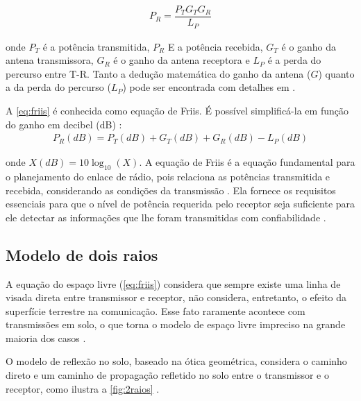 \begin{equation}
	\begin{aligned}
	\label{eq:friis}
		P_R = \dfrac{P_TG_TG_R}{L_P}
	\end{aligned}
\end{equation}

\noindent onde $P_T$ é a potência transmitida, $P_R$ E a potência recebida, $G_T$ é o ganho da antena transmissora, $G_R$ é o ganho da antena receptora e $L_P$ é a perda do percurso entre T-R. Tanto a dedução matemática do ganho da antena ($G$) quanto a da perda do percurso ($L_P$) pode ser encontrada com detalhes em .

A \autoref{eq:friis} é conhecida como equação de Friis. É possível simplificá-la em função do ganho em decibel (dB) \cite{haykin2008}:
\begin{equation}
	\begin{aligned}
	\label{eq:friis-decibel}
		P_R(dB) = P_T(dB) + G_T(dB) + G_R(dB) - L_P(dB)
	\end{aligned}
\end{equation}

\noindent onde $X(dB) = 10\log_{10} (X)$. A equação de Friis é a equação fundamental para o planejamento do enlace de rádio, pois relaciona as potências transmitida e recebida, considerando as condições da transmissão \cite{haykin2008}. Ela fornece os requisitos essenciais para que o nível de potência requerida pelo receptor seja suficiente para ele detectar as informações que lhe foram transmitidas com confiabilidade \cite{haykin2008}.

\subsection{Modelo de dois raios}
\label{sub:modelo-2-raios}

A equação do espaço livre (\autoref{eq:friis}) considera que sempre existe uma linha de visada direta entre transmissor e receptor, não considera, entretanto, o efeito da superfície terrestre na comunicação. Esse fato raramente acontece com transmissões em solo, o que torna o modelo de espaço livre impreciso na grande maioria dos casos \cite{rappaport2009}.

O modelo de reflexão no solo, baseado na ótica geométrica, considera o caminho direto e um caminho de propagação refletido no solo entre o transmissor e o receptor, como ilustra a \autoref{fig:2raios} \cite{rappaport2009}.

